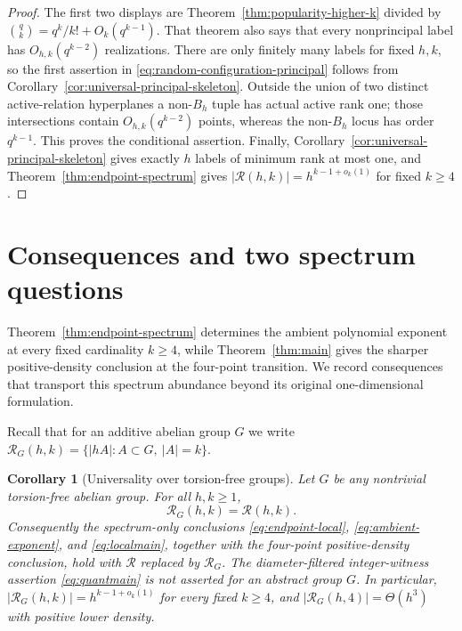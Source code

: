 \documentclass[11pt,reqno]{amsart}
\newtheorem{corollary}[theorem]{Corollary}
\theoremstyle{definition}
\theoremstyle{remark}
\newcommand{\Rcal}{\mathcal R}
\begin{document}
\begin{proof}
The first two displays are Theorem~\ref{thm:popularity-higher-k} divided by
$\binom qk=q^k/k!+O_k(q^{k-1})$.  That theorem also says that every
nonprincipal label has $O_{h,k}(q^{k-2})$ realizations.  There are only
finitely many labels for fixed $h,k$, so the first assertion in
\eqref{eq:random-configuration-principal} follows from
Corollary~\ref{cor:universal-principal-skeleton}.  Outside the union of two
distinct active-relation hyperplanes a non-$B_h$ tuple has actual active rank
one; those intersections contain $O_{h,k}(q^{k-2})$ points, whereas the
non-$B_h$ locus has order $q^{k-1}$.  This proves the conditional assertion.
Finally, Corollary~\ref{cor:universal-principal-skeleton} gives exactly $h$
labels of minimum rank at most one, and
Theorem~\ref{thm:endpoint-spectrum} gives
$|\Rcal(h,k)|=h^{k-1+o_k(1)}$ for fixed $k\geq4$.
\end{proof}

\section{Consequences and two spectrum questions}\label{sec:questions}

Theorem~\ref{thm:endpoint-spectrum} determines the ambient polynomial
exponent at every fixed cardinality $k\geq4$, while
Theorem~\ref{thm:main} gives the sharper positive-density conclusion at the
four-point transition.  We record consequences that transport this spectrum
abundance beyond its original one-dimensional formulation.

Recall that for an additive abelian group $G$ we write
$\Rcal_G(h,k)=\{|hA|:A\subset G,\ |A|=k\}$.

\begin{corollary}[Universality over torsion-free groups]
\label{cor:lattice-transfer}
Let $G$ be any nontrivial torsion-free abelian group.  For all $h,k\geq1$,
\begin{equation}\label{eq:torsion-free-spectrum-universality}
 \Rcal_G(h,k)=\Rcal(h,k).
\end{equation}
Consequently the spectrum-only conclusions
\eqref{eq:endpoint-local}, \eqref{eq:ambient-exponent}, and
\eqref{eq:localmain}, together with the four-point positive-density
conclusion, hold with $\Rcal$ replaced by $\Rcal_G$.  The diameter-filtered
integer-witness assertion \eqref{eq:quantmain} is not asserted for an
abstract group $G$.  In particular,
$|\Rcal_G(h,k)|=h^{k-1+o_k(1)}$ for every fixed $k\geq4$, and
$|\Rcal_G(h,4)|=\Theta(h^3)$ with positive lower density.
\end{corollary}
\end{document}
